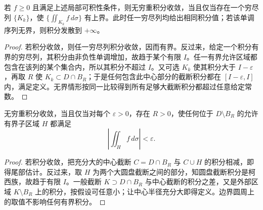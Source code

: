 \documentclass[UTF8,12pt,a4paper,fontset=fandol]{ctexbook}
\begin{document}
\begin{theorem}[非负函数的有界性判据]
\label{thm:multiple-nonnegative-exhaustion}
若 $f\geq0$ 且满足上述局部可积性条件，则无穷重积分收敛，当且仅当存在一个穷尽列 $\{K_k\}$，使 $\{\iint_{K_k}f\,d\sigma\}$ 有上界。此时任一穷尽列均给出相同积分值；若该单调序列无界，则积分发散到 $+\infty$。
\end{theorem}
\begin{proof}
若积分收敛，则任一穷尽列积分收敛，因而有界。反过来，给定一个积分有界的穷尽列，其积分由非负性单调增加，故趋于某个有限 $I$。任一有界允许区域都包含在该列的某个集合内，所以其积分不超过 $I$。又可选 $K_k$ 使其积分大于 $I-\varepsilon$，再取 $R$ 使 $K_k\subset D\cap B_R$；于是任何包含此中心部分的截断积分都在 $[I-\varepsilon,I]$ 内，满足定义。无界情形按同一比较得到所有足够大截断积分都超过任意给定常数。
\end{proof}

\begin{proposition}[柯西尾部判据]
\label{prop:multiple-improper-cauchy}
无穷重积分收敛，当且仅当对每个 $\varepsilon>0$，存在 $R>0$，使任何位于 $D\setminus B_R$ 的允许有界子区域 $H$ 都满足
\begin{equation}
    \left|\iint_Hf\,d\sigma\right|<\varepsilon.
    \label{eq:multiple-improper-cauchy}
\end{equation}
\end{proposition}
\begin{proof}
若积分收敛，把充分大的中心截断 $C=D\cap B_R$ 与 $C\cup H$ 的积分相减，即得尾部估计。反过来，取 $H$ 为两个大圆盘截断之间的部分，知圆盘截断积分是柯西族，故趋于有限 $I$。一般截断 $K\supset D\cap B_R$ 与中心截断的积分之差，又是外部区域 $K\setminus B_R$ 上的积分，按假设可任意小；让中心半径充分大即得定义。边界圆周上的取值不影响任何有界积分。
\end{proof}
\end{document}
